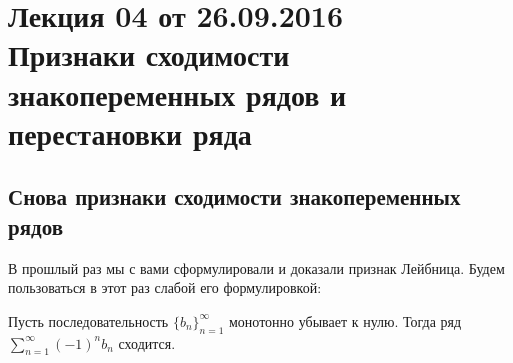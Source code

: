 \section{Лекция 04 от 26.09.2016 \\ Признаки сходимости знакопеременных рядов и перестановки ряда}
\subsection{Снова признаки сходимости знакопеременных рядов}

В прошлый раз мы с вами сформулировали и доказали признак Лейбница. Будем пользоваться в этот раз слабой его формулировкой:
\begin{Test}
	Пусть последовательность $\{b_n\}_{n = 1}^{\infty}$ монотонно убывает к нулю. Тогда ряд $\sum\limits_{n = 1}^{\infty}(-1)^n b_n$ сходится. 
\end{Test}

